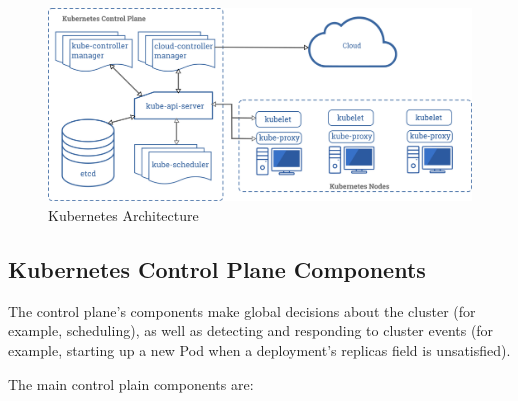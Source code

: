 \begin{figure}
	\centering
	\includegraphics[width=\textwidth]{resources/components-of-kubernetes.png}
	\caption{Kubernetes Architecture}
\end{figure}


\subsection{Kubernetes Control Plane Components}
The control plane's components make global decisions about the cluster (for
example, scheduling), as well as detecting and responding to cluster events (for
example, starting up a new Pod when a deployment's replicas field is
unsatisfied).

The main control plain components are:

